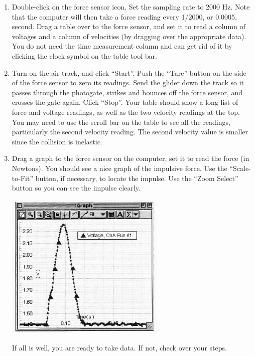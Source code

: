 \begin{enumerate}[label=\arabic*.]
\item Double-click on the force sensor icon.  Set the sampling rate to 2000 Hz.  Note that the computer will then take a force reading every 1/2000, or 0.0005, second.  Drag a table over to the force sensor, and set it to read a column of voltages and a column of velocities (by dragging over the appropriate data).  You do not need the time measurement column and can get rid of it by clicking the clock symbol on the table tool bar.

\item Turn on the air track, and click ``Start''. Push the ``Tare'' button on the side of the force sensor to zero its readings.  Send the glider down the track so it passes through the photogate, strikes and bounces off the force sensor, and crosses the gate again.  Click ``Stop''.  Your table should show a long list of force and voltage readings, as well as the two velocity readings at the top.  You may need to use the scroll bar on the table to see all the readings, particularly the second velocity reading.  The second velocity value is smaller since the collision is inelastic.

\item Drag a graph to the force sensor on the computer, set it to read the
	force (in Newtons).  You should see a nice graph of the impulsive force.  Use the ``Scale-to-Fit'' button, if necessary, to locate the impulse.  Use the ``Zoom Select'' button so you can see the impulse clearly.
\begin{center}
\includegraphics*[width=0.6\textwidth]{imgs/6labs/6Alab/6Aexp5/MI_graph1_fix3.jpg}\label{fig:impulse-curve}\end{center}
If all is well, you are ready to take data.  If not, check over your steps.


\end{enumerate}

